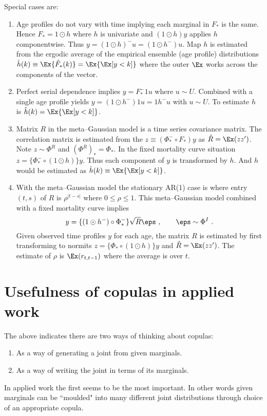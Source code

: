 \begin{enumerate}
Special cases are:
\begin{enumerate}
    \item Age profiles do not vary with time implying each marginal in  $F_*$ is the same.  Hence $F_*=1\odot h$ where $h$ is univariate and $(1\odot h) y$ applies $h$ componentwise.  Thus $y=(1\odot h)^-u=(1\odot h^-)u$.  Map $h$ is estimated from the ergodic average of the empirical ensemble (age profile) distributions
$
\hat h(k)\equiv \Ex\{\hat F_*(k)\}=\Ex\{\Ex[y<k]\}
$ where the outer $\Ex$ works across the components of the vector.
    \item Perfect serial dependence implies $y= F_*^-1u$ where $u\sim U$. Combined with a single age profile yields $y=(1\odot h^-)1u=1h^-u$ with $u\sim U$.  To estimate $h$ is $\hat h(k)=\Ex\{\Ex[y<k]\}$.   
    \item Matrix $R$ in the meta--Gaussian model is a time series covariance matrix.  The correlation matrix is estimated from the $z\equiv(\Phi_*^-\circ F_*)y$ as
$
\hat R = \Ex(zz')
$.
Note $z\sim \Phi^R$ and $(\Phi^R)_*=\Phi_*$.  In the fixed mortality curve situation $z=\{\Phi_*^-\circ(1\odot h)\}y$.  Thus each component of $y$ is transformed by $h$.  And $h$ would be estimated as $\hat h(k)\equiv\Ex\{\Ex[y<k]\}$.

\item    With the meta--Gaussian model the stationary AR(1) case  is where entry $(t,s)$ of $R$ is $\rho^{|t-s|}$ where $0\le\rho\le 1$.  This meta--Gaussian model combined with a fixed mortality curve implies 
$$
y=\{(1\odot h^-)\circ \Phi_*^-\}\sqrt{R}\eps\ , \qquad \eps\sim \Phi^I\ .
$$
Given observed time profiles $y$ for each age, the matrix $R$ is estimated by first transforming to normits 
$
z=\{\Phi_*\circ(1\odot h)\}y
$ and $\hat R = \Ex(zz')$.  The estimate of $\rho$ is $\Ex(r_{t,t-1})$ where the average is over $t$. 
\end{enumerate}     
\end{enumerate}    



\section{Usefulness of copulas in applied work}

 The above indicates there are two ways of thinking about copulas:
\begin{enumerate}
    \item As a way of generating a joint from given marginals.
    \item As a way of writing the joint in terms of its marginals.
\end{enumerate}    
In applied work the first seems to be the most important.   In other words given marginals can be ``moulded" into many different joint distributions through choice of an appropriate copula.




